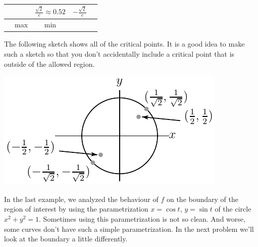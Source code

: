 \begin{eg}
\begin{center}
\begin{tabular}{|c|c|c|c|c|}
       &\raisebox{2pt}{$-\tfrac{1}{\sqrt{e}}$}
       &$\tfrac{\sqrt{2}}{e}\approx0.52$
       &$-\tfrac{\sqrt{2}}{e}$ \\ \hline
       & max 
       & min
       & & \\ \hline
     \end{tabular}
\renewcommand{\arraystretch}{1.0}
\end{center}
The following sketch shows all of the critical points. It is a good idea
to make such a sketch so that you don't accidentally include a critical
point that is outside of the allowed region.
\begin{efig}
\begin{center}
   \includegraphics{optExampleA}
\end{center}
\end{efig}
\end{eg}
\goodbreak

In the last example, we analyzed the behaviour of $f$ on the boundary
of the region of interest by using the parametrization $x=\cos t$, $y=\sin t$
of the circle $x^2+y^2=1$. Sometimes using this parametrization is not
so clean. And worse, some curves don't have such a simple parametrization.
In the next problem we'll look at the boundary a little differently. 

